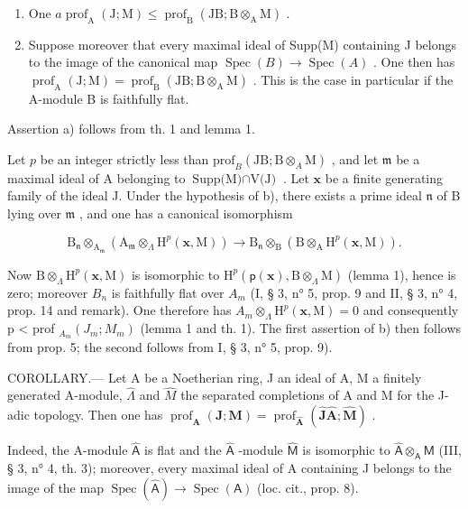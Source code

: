 \begin{enumerate}
\def\labelenumi{\alph{enumi})}
\item
  One \(a \operatorname{prof}_{\mathrm{A}}(\mathrm{J}; \mathrm{M}) \leqslant \operatorname{prof}_{\mathrm{B}}(\mathrm{JB}; \mathrm{B} \otimes_{\mathrm{A}} \mathrm{M})\) .
\item
  Suppose moreover that every maximal ideal of Supp(M) containing J belongs to the image of the canonical map \(\operatorname{Spec}(B) \to \operatorname{Spec}(A)\) . One then has \(\operatorname{prof}_{\mathrm{A}}(\mathrm{J}; \mathrm{M}) = \operatorname{prof}_{\mathrm{B}}(\mathrm{JB}; \mathrm{B} \otimes_{\mathrm{A}} \mathrm{M})\) . This is the case in particular if the A-module B is faithfully flat.
\end{enumerate}

Assertion a) follows from th. 1 and lemma 1.

Let \(p\) be an integer strictly less than \(\text{prof}_B(\text{JB};\text{B} \otimes_A \text{M})\) , and let \(\mathfrak{m}\) be a maximal ideal of A belonging to \(\text{Supp(M)} \cap \text{V(J)}\) . Let \(\mathbf{x}\) be a finite generating family of the ideal J. Under the hypothesis of b), there exists a prime ideal \(\mathfrak{n}\) of B lying over \(\mathfrak{m}\) , and one has a canonical isomorphism

\[
\mathrm{B} _ {\mathfrak {n}} \otimes_ {\mathrm{A} _ {\mathfrak {m}}} \left(\mathrm{A} _ {\mathfrak {m}} \otimes_ {\Lambda} \mathrm{H} ^ {p} (\mathbf {x}, \mathrm{M})\right) \longrightarrow \mathrm{B} _ {\mathfrak {n}} \otimes_ {\mathrm{B}} \left(\mathrm{B} \otimes_ {\mathrm{A}} \mathrm{H} ^ {p} (\mathbf {x}, \mathrm{M})\right).
\]

Now \(\mathrm{B}\otimes_{\Lambda}\mathrm{H}^{p}(\mathbf{x},\mathrm{M})\) is isomorphic to \(\mathrm{H}^{p}(\mathsf{p}(\mathbf{x}),\mathrm{B}\otimes_{\Lambda}\mathrm{M})\) (lemma 1), hence is zero; moreover \(B_{n}\) is faithfully flat over \(A_{m}\) (I, § 3, n° 5, prop. 9 and II, § 3, n° 4, prop. 14 and remark). One therefore has \(A_{m}\otimes_{\Lambda}\mathrm{H}^{p}(\mathbf{x},\mathrm{M})=0\) and consequently p \textless{} prof \(_{A_{m}}(J_{m};M_{m})\) (lemma 1 and th. 1). The first assertion of b) then follows from prop. 5; the second follows from I, § 3, n° 5, prop. 9).

COROLLARY.--- Let A be a Noetherian ring, J an ideal of A, M a finitely generated A-module, \(\widehat{\Lambda}\) and \(\widehat{M}\) the separated completions of A and M for the J-adic topology. Then one has \(\operatorname{prof}_{\mathbf{A}}(\mathbf{J};\mathbf{M}) = \operatorname{prof}_{\widehat{\mathbf{A}}}(\widehat{\mathbf{J}}\widehat{\mathbf{A}};\widehat{\mathbf{M}})\) .

Indeed, the A-module \(\widehat{\mathsf{A}}\) is flat and the \(\widehat{\mathsf{A}}\) -module \(\widehat{\mathsf{M}}\) is isomorphic to \(\widehat{\mathsf{A}}\otimes_{\mathsf{A}}\mathsf{M}\) (III, § 3, n° 4, th. 3); moreover, every maximal ideal of A containing J belongs to the image of the map \(\operatorname{Spec}(\widehat{\mathsf{A}})\to\operatorname{Spec}(\mathsf{A})\) (loc. cit., prop. 8).


